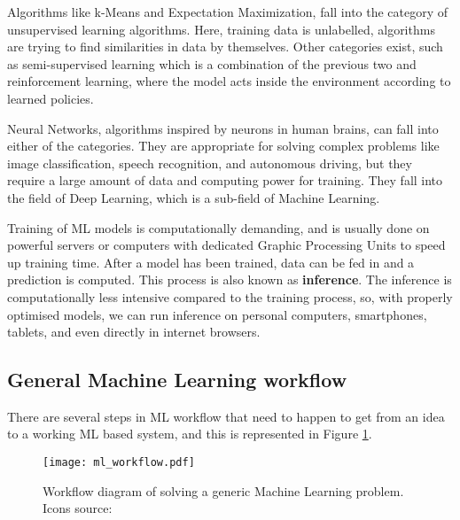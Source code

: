 Algorithms like k-Means and Expectation Maximization, fall into the category of unsupervised learning algorithms.
Here, training data is unlabelled, algorithms are trying to find similarities in data by themselves\cite{geron}.
Other categories exist, such as semi-supervised learning which is a combination of the previous two and reinforcement learning, where the model acts inside the environment according to learned policies\cite{geron}.

Neural Networks, algorithms inspired by neurons in human brains\cite{geron}\cite{cs231n}, can fall into either of the categories. 
They are appropriate for solving complex problems like image classification, speech recognition, and autonomous driving, but they require a large amount of data and computing power for training.
They fall into the field of Deep Learning, which is a sub-field of Machine Learning.

Training of ML models is computationally demanding, and is usually done on powerful servers or computers with dedicated Graphic Processing Units to speed up training time.
After a model has been trained, data can be fed in and a prediction is computed. 
This process is also known as \textbf{inference}.
The inference is computationally less intensive compared to the training process, so, with properly optimised models, we can run inference on personal computers, smartphones, tablets, and even directly in internet browsers.


\subsection{ General Machine Learning workflow}

There are several steps in ML workflow that need to happen to get from an idea to a working ML based system, and this is represented in Figure \ref{ml_workflow}.

\begin{figure}[ht]
        \centering
        \texttt{[image: ml\_workflow.pdf]} 
        \caption[Workflow diagram of solving a generic Machine Learning problem.] {Workflow diagram of solving a generic Machine Learning problem. Icons source:\cite{icons}}
        \label{ml_workflow}
\end{figure}


